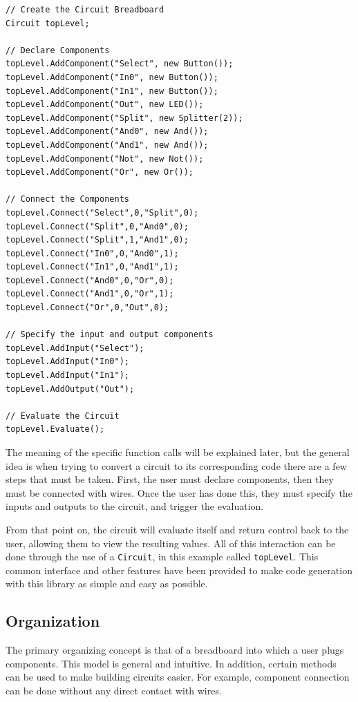 \documentclass{article}
\newcommand{\ClassName}[1]{\texttt{#1}}
\begin{document}
\begin{lstlisting}
// Create the Circuit Breadboard
Circuit topLevel;

// Declare Components
topLevel.AddComponent("Select", new Button());
topLevel.AddComponent("In0", new Button());
topLevel.AddComponent("In1", new Button());
topLevel.AddComponent("Out", new LED());
topLevel.AddComponent("Split", new Splitter(2));
topLevel.AddComponent("And0", new And());
topLevel.AddComponent("And1", new And());
topLevel.AddComponent("Not", new Not());
topLevel.AddComponent("Or", new Or());

// Connect the Components
topLevel.Connect("Select",0,"Split",0);
topLevel.Connect("Split",0,"And0",0);
topLevel.Connect("Split",1,"And1",0);
topLevel.Connect("In0",0,"And0",1);
topLevel.Connect("In1",0,"And1",1);
topLevel.Connect("And0",0,"Or",0);
topLevel.Connect("And1",0,"Or",1);
topLevel.Connect("Or",0,"Out",0);

// Specify the input and output components
topLevel.AddInput("Select");
topLevel.AddInput("In0");
topLevel.AddInput("In1");
topLevel.AddOutput("Out");

// Evaluate the Circuit
topLevel.Evaluate();
\end{lstlisting}

The meaning of the specific function calls will be explained later, but the general idea is when trying to convert a circuit to its corresponding code there are a few steps that must be taken. First, the user must declare components, then they must be connected with wires. Once the user has done this, they must specify the inputs and outputs to the circuit, and trigger the evaluation.

From that point on, the circuit will evaluate itself and return control back to the user, allowing them to view the resulting values. All of this interaction can be done through the use of a \ClassName{Circuit}, in this example called \ClassName{topLevel}. This common interface and other features have been provided to make code generation with this library as simple and easy as possible.

\subsection{Organization}

The primary organizing concept is that of a breadboard into which a user plugs components. This model is general and intuitive. In addition, certain methods can be used to make building circuits easier. For example, component connection can be done without any direct contact with wires.
\end{document}
